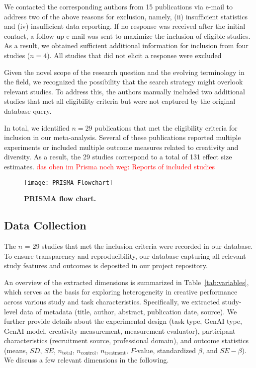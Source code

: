 \documentclass[manuscript, screen, review, acmsmall, anonymous]{acmart}
\newcommand{\TODO}[1]{\textcolor{red}{#1}}
\begin{document}
We contacted the corresponding authors from 15 publications via e-mail to address two of the above reasons for exclusion, namely, (ii) insufficient statistics and (iv) insufficient data reporting. If no response was received after the initial contact, a follow-up e-mail was sent to maximize the inclusion of eligible studies. As a result, we obtained sufficient additional information for inclusion from four studies ($n = 4$). All studies that did not elicit a response were excluded

Given the novel scope of the research question and the evolving terminology in the field, we recognized the possibility that the search strategy might overlook relevant studies. To address this, the authors manually included two additional studies that met all eligibility criteria but were not captured by the original database query.

In total, we identified $n = 29$ publications that met the eligibility criteria for inclusion in our meta-analysis. Several of these publications reported multiple experiments or included multiple outcome measures related to creativity and diversity. As a result, the 29 studies correspond to a total of 131 effect size estimates. \TODO{das oben im Prisma noch weg: Reports of included studies}



\begin{figure}[h]
  \centering
  \texttt{[image: PRISMA\_Flowchart]}
  \vspace{-0.8cm}
  \caption{\textbf{PRISMA flow chart.}}
  \label{fig:PRIMSAFlowchart}
\end{figure}


\subsection{Data Collection}


The $n$ = 29 studies that met the inclusion criteria were recorded in our database. To ensure transparency and reproducibility, our database capturing all relevant study features and outcomes is deposited in our project repository. 

An overview of the extracted dimensions is summarized in Table~\ref{tab:variables}, which serves as the basis for exploring heterogeneity in creative performance across various study and task characteristics. Specifically, we extracted study-level data of metadata (title, author, abstract, publication date, source). We further provide details about the experimental design  (task type, GenAI type, GenAI model, creativity measurement, measurement evaluator), participant characteristics (recruitment source, professional domain), and outcome statistics (means, $SD$, $SE$, $n_\mathrm{total}$, $n_\mathrm{control}$, $n_\mathrm{treatment}$, $F$-value, standardized $\beta$, and $SE-\beta$). We discuss a few relevant dimensions in the following.
\end{document}
